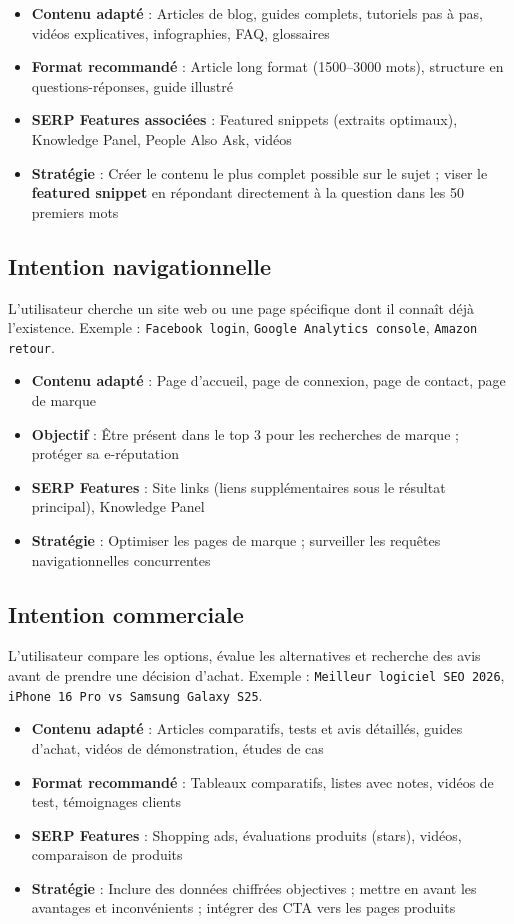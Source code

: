 \documentclass[12pt,a4paper,twoside]{report}
\newcommand{\keyword}[1]{\textbf{\textcolor{googleblue}{#1}}}
\begin{document}
\begin{itemize}
    \item \textbf{Contenu adapté} : Articles de blog, guides complets, tutoriels pas à pas, vidéos explicatives, infographies, FAQ, glossaires
    \item \textbf{Format recommandé} : Article long format (1500--3000 mots), structure en questions-réponses, guide illustré
    \item \textbf{SERP Features associées} : Featured snippets (extraits optimaux), Knowledge Panel, People Also Ask, vidéos
    \item \textbf{Stratégie} : Créer le contenu le plus complet possible sur le sujet ; viser le \keyword{featured snippet} en répondant directement à la question dans les 50 premiers mots
\end{itemize}

\subsection{Intention navigationnelle}
L'utilisateur cherche un site web ou une page spécifique dont il connaît déjà l'existence. Exemple : \texttt{Facebook login}, \texttt{Google Analytics console}, \texttt{Amazon retour}.

\begin{itemize}
    \item \textbf{Contenu adapté} : Page d'accueil, page de connexion, page de contact, page de marque
    \item \textbf{Objectif} : Être présent dans le top 3 pour les recherches de marque ; protéger sa e-réputation
    \item \textbf{SERP Features} : Site links (liens supplémentaires sous le résultat principal), Knowledge Panel
    \item \textbf{Stratégie} : Optimiser les pages de marque ; surveiller les requêtes navigationnelles concurrentes
\end{itemize}

\subsection{Intention commerciale}
L'utilisateur compare les options, évalue les alternatives et recherche des avis avant de prendre une décision d'achat. Exemple : \texttt{Meilleur logiciel SEO 2026}, \texttt{iPhone 16 Pro vs Samsung Galaxy S25}.

\begin{itemize}
    \item \textbf{Contenu adapté} : Articles comparatifs, tests et avis détaillés, guides d'achat, vidéos de démonstration, études de cas
    \item \textbf{Format recommandé} : Tableaux comparatifs, listes avec notes, vidéos de test, témoignages clients
    \item \textbf{SERP Features} : Shopping ads, évaluations produits (stars), vidéos, comparaison de produits
    \item \textbf{Stratégie} : Inclure des données chiffrées objectives ; mettre en avant les avantages et inconvénients ; intégrer des CTA vers les pages produits
\end{itemize}
\end{document}
